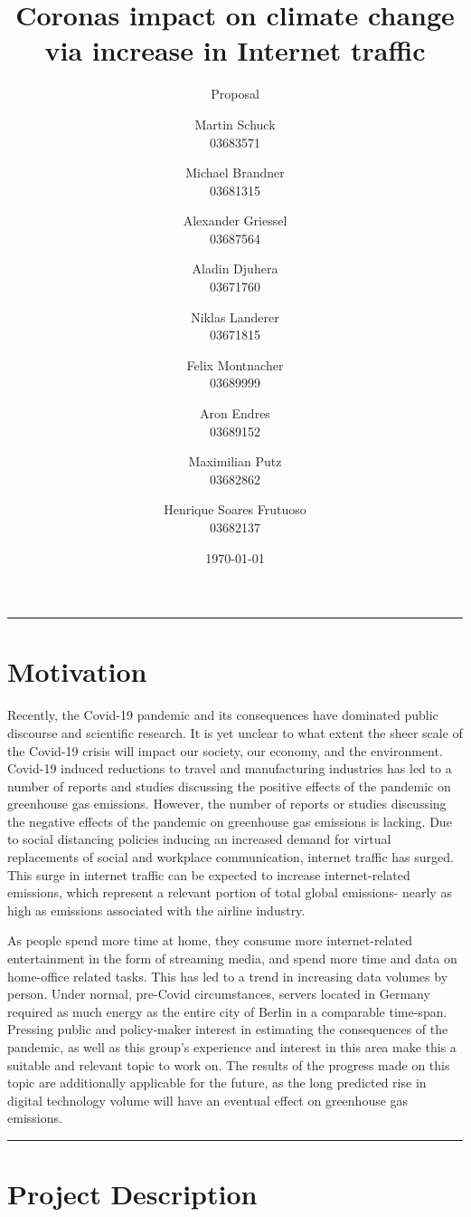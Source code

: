\documentclass[s=english,inputenc=utf8,fontsize=10pt]{ldvarticle}
\title{Coronas impact on climate change via increase in Internet traffic}
\subtitle{Proposal}
\author{Martin Schuck\\
03683571
\and
Michael Brandner\\
03681315
\and
Alexander Griessel\\
03687564
\and
Aladin Djuhera\\
03671760
\and
Niklas Landerer\\
03671815
\and
Felix Montnacher\\
03689999
\and
Aron Endres\\
03689152
\and
Maximilian Putz\\
03682862
\and
Henrique Soares Frutuoso\\
03682137
}
\date{\today}
\begin{document}
\maketitle
\thispagestyle{empty}

\hrule

\section*{Motivation}

Recently, the Covid-19 pandemic and its consequences have dominated public discourse and scientific research. It is yet unclear to what extent the sheer scale of the Covid-19 crisis will impact our society, our economy, and the environment. Covid-19 induced reductions to travel and manufacturing industries has led to a number of reports and studies discussing the positive effects of the pandemic on greenhouse gas emissions. However, the number of reports or studies discussing the negative effects of the pandemic on greenhouse gas emissions is lacking. Due to social distancing policies inducing an increased demand for virtual replacements of social and workplace communication, internet traffic has surged. This surge in internet traffic can be expected to increase internet-related emissions, which represent a relevant portion of total global emissions- nearly as high as emissions associated with the airline industry. 

As people spend more time at home, they consume more internet-related entertainment in the form of streaming media, and spend more time and data on home-office related tasks. This has led to a trend in increasing data volumes by person. Under normal, pre-Covid circumstances, servers located in Germany required as much energy as the entire city of Berlin in a comparable time-span. Pressing public and policy-maker interest in estimating the consequences of the pandemic, as well as this group’s experience and interest in this area make this a suitable and relevant topic to work on. The results of the progress made on this topic are additionally applicable for the future, as the long predicted rise in digital technology volume will have an eventual effect on greenhouse gas emissions.

\vspace*{1cm}
\hrule

\newpage

\section{Project Description}
\end{document}
